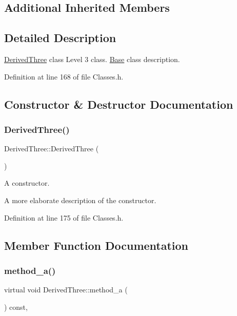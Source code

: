 \subsection*{Additional Inherited Members}


\subsection{Detailed Description}
\hyperlink{class_derived_three}{Derived\+Three} class Level 3 class. \hyperlink{class_base}{Base} class description. 

Definition at line 168 of file Classes.\+h.



\subsection{Constructor \& Destructor Documentation}
\mbox{\label{class_derived_three_a7787b8ff6ade268d734edcdea3df5a2b}} 
\subsubsection{\texorpdfstring{Derived\+Three()}{DerivedThree()}}
{\footnotesize\ttfamily Derived\+Three\+::\+Derived\+Three (\begin{DoxyParamCaption}{ }\end{DoxyParamCaption})\hspace{0.3cm}{\ttfamily [inline]}}



A constructor. 

A more elaborate description of the constructor. 

Definition at line 175 of file Classes.\+h.



\subsection{Member Function Documentation}
\mbox{\label{class_derived_three_a74d2afff499ae551a424aa5d1da14620}} 
\subsubsection{\texorpdfstring{method\+\_\+a()}{method\_a()}}
{\footnotesize\ttfamily virtual void Derived\+Three\+::method\+\_\+a (\begin{DoxyParamCaption}{ }\end{DoxyParamCaption}) const\hspace{0.3cm}{\ttfamily [inline]}, {\ttfamily [virtual]}}



